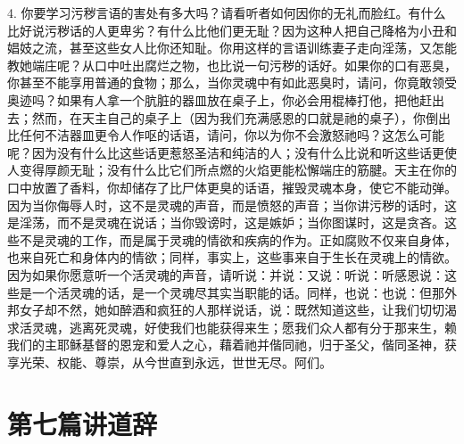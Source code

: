 4. 你要学习污秽言语的害处有多大吗？请看听者如何因你的无礼而脸红。有什么比好说污秽话的人更卑劣？有什么比他们更无耻？因为这种人把自己降格为小丑和娼妓之流，甚至这些女人比你还知耻。你用这样的言语训练妻子走向淫荡，又怎能教她端庄呢？从口中吐出腐烂之物，也比说一句污秽的话好。如果你的口有恶臭，你甚至不能享用普通的食物；那么，当你灵魂中有如此恶臭时，请问，你竟敢领受奥迹吗？如果有人拿一个肮脏的器皿放在桌子上，你必会用棍棒打他，把他赶出去；然而，在天主自己的桌子上（因为我们充满感恩的口就是祂的桌子），你倒出比任何不洁器皿更令人作呕的话语，请问，你以为你不会激怒祂吗？这怎么可能呢？因为没有什么比这些话更惹怒圣洁和纯洁的人；没有什么比说和听这些话更使人变得厚颜无耻；没有什么比它们所点燃的火焰更能松懈端庄的筋腱。天主在你的口中放置了香料，你却储存了比尸体更臭的话语，摧毁灵魂本身，使它不能动弹。因为当你侮辱人时，这不是灵魂的声音，而是愤怒的声音；当你讲污秽的话时，这是淫荡，而不是灵魂在说话；当你毁谤时，这是嫉妒；当你图谋时，这是贪吝。这些不是灵魂的工作，而是属于灵魂的情欲和疾病的作为。正如腐败不仅来自身体，也来自死亡和身体内的情欲；同样，事实上，这些事来自于生长在灵魂上的情欲。因为如果你愿意听一个活灵魂的声音，请听说：并说：又说：听说：听感恩说：这些是一个活灵魂的话，是一个灵魂尽其实当职能的话。同样，也说：也说：但那外邦女子却不然，她如醉酒和疯狂的人那样说话，说：既然知道这些，让我们切切渴求活灵魂，逃离死灵魂，好使我们也能获得来生；愿我们众人都有分于那来生，赖我们的主耶稣基督的恩宠和爱人之心，藉着祂并偕同祂，归于圣父，偕同圣神，获享光荣、权能、尊崇，从今世直到永远，世世无尽。阿们。\par



\section{第七篇讲道辞}

